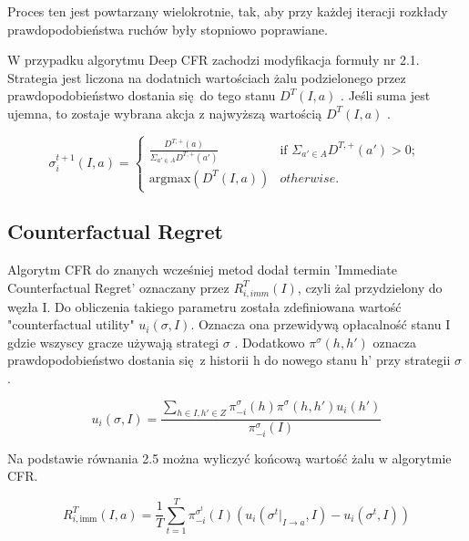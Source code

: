 \documentclass[12pt,oneside,a4paper]{report}
\begin{document}
Proces ten jest powtarzany wielokrotnie, tak, aby przy każdej iteracji rozkłady prawdopodobieństwa
ruchów były stopniowo
poprawiane.

W przypadku algorytmu Deep CFR zachodzi modyfikacja formuły nr 2.1. Strategia jest liczona na
dodatnich wartościach żalu podzielonego przez  prawdopodobieństwo dostania się do 
tego stanu $D^{T} (I, a)$ \cite{DCFR}.
Jeśli suma jest ujemna, to zostaje wybrana akcja z najwyższą wartością $D^{T}(I, a)$ \cite{DCFR}.



\begin{equation}
\sigma^{t+1}_{i}\left(I, a \right) = \left\{ \begin{array}{ll}
      \frac{D^{T, \text{+}}\left(a\right)}{ \Sigma_{a' \in A} D^{T,\text{+}}\left(a'\right)} &
      \mbox{if $\Sigma_{a' \in A} D^{T,\text{+}}\left(a'\right) >
      0$};\\
      \text{argmax}(D^{T} (I, a)) & \mbox{$otherwise$}.\end{array} \right. \ 
\end{equation}



\subsection{Counterfactual Regret}

Algorytm CFR do znanych wcześniej metod dodał termin 'Immediate Counterfactual Regret' oznaczany przez $R^{T}_{i,
imm} (I)$, 
czyli żal przydzielony do węzła I.
Do obliczenia takiego parametru została zdefiniowana wartość "counterfactual utility" $u_{i}(\sigma,
I)$. Oznacza ona przewidywą opłacalność stanu I gdzie wszyscy gracze używają strategi
$\sigma$ \cite{CFR}. Dodatkowo $\pi^{\sigma} (h, h')$ oznacza prawdopodobieństwo dostania się z historii h do 
nowego stanu h' przy strategii $\sigma$ \cite{CFR}.

\begin{equation}
   u_{i} (\sigma, I) = \frac{\sum_{h \in I, h' \in Z} \pi^{\sigma}_{-i} (h) \pi^{\sigma} (h,
   h') u_{i}(h')}{\pi_{-i}^{\sigma}(I)}
\end{equation}

Na podstawie równania 2.5 można wyliczyć końcową wartość żalu w algorytmie CFR.

\begin{equation}
   R^{T}_{i,\text{imm}} (I, a) = \frac{1}{T} \sum^{T}_{t=1} \pi^{\sigma^{t}}_{-i} (I)
   (u_{i}(\sigma^{t}|_{I \rightarrow a}, I) - u_{i}(\sigma^{t}, I))
\end{equation}
\end{document}
